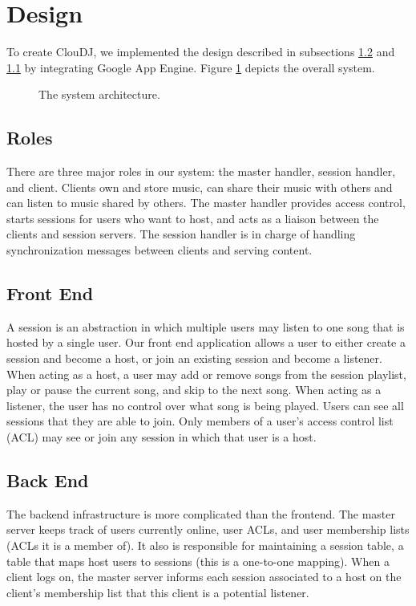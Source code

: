 \section{Design}
\label{sec:design}
To create ClouDJ, we implemented the design described 
in subsections \ref{sec:frontend} and \ref{sec:roles} 
by integrating Google App Engine. 
Figure \ref{fig:arch} depicts the overall system.

\begin{figure}[h]
\caption{The system architecture.}
\label{fig:arch}
\end{figure}

\subsection{Roles}
\label{sec:roles}
There are three major roles in our system: 
the master handler, session handler, and client. Clients own 
and store music, can share their music with others 
and can listen to music shared by others. The master handler provides 
access control, starts sessions for users who want to host, and
acts as a liaison between the clients and session servers. The session 
handler is in charge of handling synchronization messages between clients
and serving content.

\subsection{Front End}
\label{sec:frontend}
A session is an abstraction in which multiple users 
may listen to one song that is hosted by a single user. 
Our front end application allows a user to either 
create a session and become a host, or join an existing 
session and become a listener. When acting as a host, 
a user may add or remove songs from the session playlist, 
play or pause the current song, and skip to the next song. 
When acting as a listener, the user has 
no control over what song is being played. Users can 
see all sessions that they are able to join. Only 
members of a user's access control list (ACL) may 
see or join any session in which that user is a host.

\subsection{Back End}
\label{sec:backend}
The backend infrastructure is more complicated than 
the frontend. The master server keeps track of users 
currently online, user ACLs, and user membership lists 
(ACLs it is a member of). It also is responsible for 
maintaining a session table, a table that maps host 
users to sessions (this is a one-to-one mapping). 
When a client logs on, the master server informs each 
session associated to a host on the client's 
membership list that this client is a potential listener.

